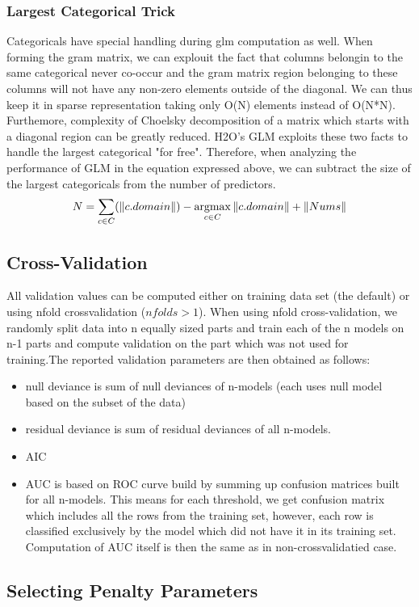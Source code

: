 \documentclass[11pt]{article}
\newcommand{\argmax}{\operatornamewithlimits{argmax}}
\begin{document}
\subsubsection{Largest Categorical Trick}
Categoricals have special handling during glm computation as well. When forming the gram matrix, we can explouit the fact that columns belongin to the same categorical never co-occur and the gram matrix region belonging to these columns will not have any non-zero elements outside of the diagonal. We can thus keep it in sparse representation taking only O(N) elements instead of O(N*N). Furthemore, complexity of Choelsky decomposition of a matrix which starts with a diagonal region can be greatly reduced. H2O's GLM exploits these two facts to handle the largest categorical "for free". Therefore, when analyzing the performance of GLM in the equation expressed above, we can subtract the size of the largest categoricals from the number of predictors.
\[ N = \sum\limits_{c \in C} (\|c.domain\|) - \argmax\limits_{c \in C} \|c.domain\|  + \| Nums \| \]

\subsection{Cross-Validation}
All validation values can be computed either on training data set (the default) or using nfold crossvalidation ($nfolds > 1$). When using nfold cross-validation, we randomly split data into n equally sized parts and train each of the n models on n-1 parts and compute validation on the part which was not used for training.The reported validation parameters are then obtained as follows:
\begin{itemize} 
\item null deviance is sum of null deviances of n-models (each uses null model based on the subset of the data)
\item residual deviance is sum of residual deviances of all n-models.
\item AIC
\item AUC is based on ROC curve build  by summing up confusion matrices built for all n-models.
This means for each threshold, we get confusion matrix which includes all the rows from
the training set, however, each row is classified exclusively by the model
which did not have it in its training set. Computation of AUC itself is then the same as in non-crossvalidatied case. 
\end{itemize}

\subsection{Selecting Penalty Parameters}
\end{document}
